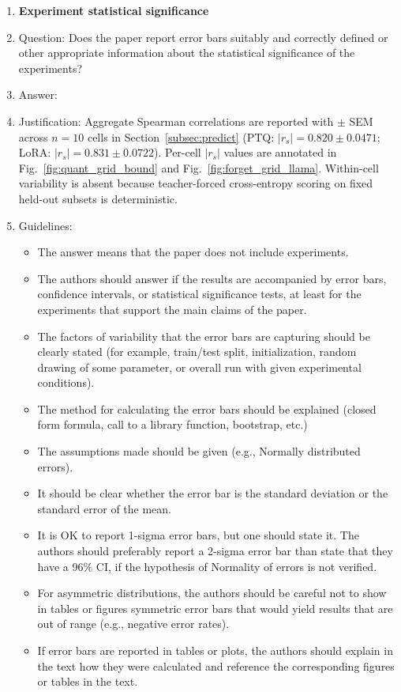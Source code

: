 \begin{enumerate}
\item {\bf Experiment statistical significance}
    \item[] Question: Does the paper report error bars suitably and correctly defined or other appropriate information about the statistical significance of the experiments?
    \item[] Answer: \answerYes{}
    \item[] Justification: Aggregate Spearman correlations are reported with $\pm$ SEM across $n{=}10$ cells in Section~\ref{subsec:predict} (PTQ: $|r_s|=0.820 \pm 0.0471$; LoRA: $|r_s|=0.831 \pm 0.0722$). Per-cell $|r_s|$ values are annotated in Fig.~\ref{fig:quant_grid_bound} and Fig.~\ref{fig:forget_grid_llama}. Within-cell variability is absent because teacher-forced cross-entropy scoring on fixed held-out subsets is deterministic.
    \item[] Guidelines:
    \begin{itemize}
        \item The answer \answerNA{} means that the paper does not include experiments.
        \item The authors should answer \answerYes{} if the results are accompanied by error bars, confidence intervals, or statistical significance tests, at least for the experiments that support the main claims of the paper.
        \item The factors of variability that the error bars are capturing should be clearly stated (for example, train/test split, initialization, random drawing of some parameter, or overall run with given experimental conditions).
        \item The method for calculating the error bars should be explained (closed form formula, call to a library function, bootstrap, etc.)
        \item The assumptions made should be given (e.g., Normally distributed errors).
        \item It should be clear whether the error bar is the standard deviation or the standard error of the mean.
        \item It is OK to report 1-sigma error bars, but one should state it. The authors should preferably report a 2-sigma error bar than state that they have a 96\% CI, if the hypothesis of Normality of errors is not verified.
        \item For asymmetric distributions, the authors should be careful not to show in tables or figures symmetric error bars that would yield results that are out of range (e.g., negative error rates).
        \item If error bars are reported in tables or plots, the authors should explain in the text how they were calculated and reference the corresponding figures or tables in the text.
    \end{itemize}


\end{enumerate}
